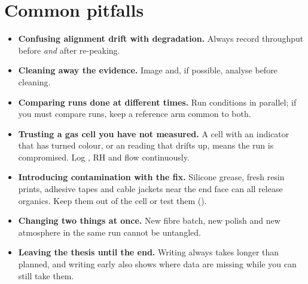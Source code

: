 \section{Common pitfalls}
\begin{pitfallbox}
\begin{itemize}[leftmargin=1em]
  \item \textbf{Confusing alignment drift with degradation.} Always record throughput before
        \emph{and} after re-peaking.
  \item \textbf{Cleaning away the evidence.} Image and, if possible, analyse before cleaning.
  \item \textbf{Comparing runs done at different times.} Run conditions in parallel; if you must
        compare runs, keep a reference arm common to both.
  \item \textbf{Trusting a gas cell you have not measured.} A cell with an indicator that has turned
        colour, or an \Oxy{} reading that drifts up, means the run is compromised. Log \Oxy{}, RH and
        flow continuously.
  \item \textbf{Introducing contamination with the fix.} Silicone grease, fresh resin prints, adhesive tapes
        and cable jackets near the end face can all release organics. Keep them out of the cell or
        test them ().
  \item \textbf{Changing two things at once.} New fibre batch, new polish and new atmosphere in the same
        run cannot be untangled.
  \item \textbf{Leaving the thesis until the end.} Writing always takes longer than planned, and writing
        early also shows where data are missing while you can still take them.
\end{itemize}
\end{pitfallbox}

